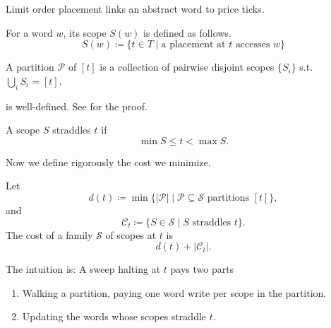 Limit order placement links an abstract word to price ticks.
\begin{definition}[Scope] \label{def:scope}
    For a word $w$, its scope $S(w)$ is defined as follows.
    \begin{equation*}
        S(w)\coloneqq\{t\in T\mid \text{a placement at }t \text{ accesses } w\}
    \end{equation*}
\end{definition}
\begin{definition}[Partition] \label{def:partition}
    A partition $\mathcal{P}$ of $[t]$ is a collection of pairwise disjoint scopes $\{S_i\}$ s.t. $\bigcup_{i}S_i=[t]$.
\end{definition}
 is well-defined. See  for the proof.
\begin{definition} \label{def:straddle}
    A scope $S$ straddles $t$ if 
    \begin{equation*}
        \min S\leq t<\max S.
    \end{equation*}
\end{definition}
Now we define rigorously the cost we minimize.
\begin{definition} \label{def:cost}
    Let
    \begin{equation*}
        d(t)\coloneqq\min\{\lvert\mathcal{P}\rvert\mid\mathcal{P}\subseteq\mathcal{S}\text{ partitions }[t]\},
    \end{equation*}
    and
    \begin{equation*}
        \mathcal{C}_t\coloneqq\{S\in\mathcal{S}\mid S\text{ straddles }t\}.
    \end{equation*}
    The cost of a family $\mathcal{S}$ of scopes at $t$ is
    \begin{equation*}
        d(t)+\lvert\mathcal{C}_t\rvert.
    \end{equation*}
\end{definition}
\begin{remark}
    The intuition is: A sweep halting at $t$ pays two parts
    \begin{enumerate}
        \item Walking a partition, paying one word write per scope in the partition.
        \item Updating the words whose scopes straddle $t$.
    \end{enumerate}
\end{remark}